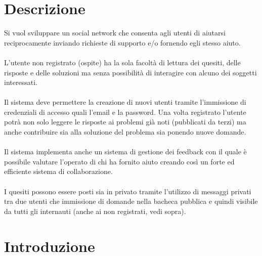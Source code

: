 \documentclass[a4paper,12pt]{article}
\begin{document}
\clearpage

	    \vspace*{\fill}
	\tableofcontents
	    \vspace*{\fill}

\clearpage

\section{Descrizione}
Si vuol sviluppare un social network che consenta agli utenti di aiutarsi reciprocamente inviando richieste di supporto e/o fornendo egli stesso aiuto. \\ \\
L’utente non registrato (ospite) ha la sola facoltà di lettura dei quesiti, delle risposte e delle soluzioni ma senza possibilità di interagire con alcuno dei soggetti interessati. \\ \\
Il sistema deve permettere la creazione di nuovi utenti tramite l’immissione di credenziali di accesso quali l’email e la password. Una volta registrato l’utente potrà non solo leggere le risposte ai problemi già noti (pubblicati da terzi) ma anche contribuire sia alla soluzione del problema sia ponendo nuove domande. \\ \\
Il sistema implementa anche un sistema di gestione dei feedback con il quale è possibile valutare l’operato di chi ha fornito aiuto creando così un forte ed efficiente sistema di collaborazione. \\ \\
I quesiti possono essere posti sia in privato tramite l’utilizzo di messaggi privati tra due utenti che immissione di domande nella bacheca pubblica e quindi visibile da tutti gli internauti (anche ai non registrati, vedi sopra).

\clearpage

\section{Introduzione}
\end{document}
